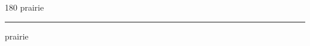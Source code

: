
\begin{frame}
\begin{center}
\begin{turn}{180}
{\fontsize{2.5cm}{1em}\selectfont prairie}
\end{turn}
\vspace{1em}\par  
\hrule
\vspace{1em}\par  
{\fontsize{2.5cm}{1em}\selectfont prairie}
\end{center}
\end{frame}
